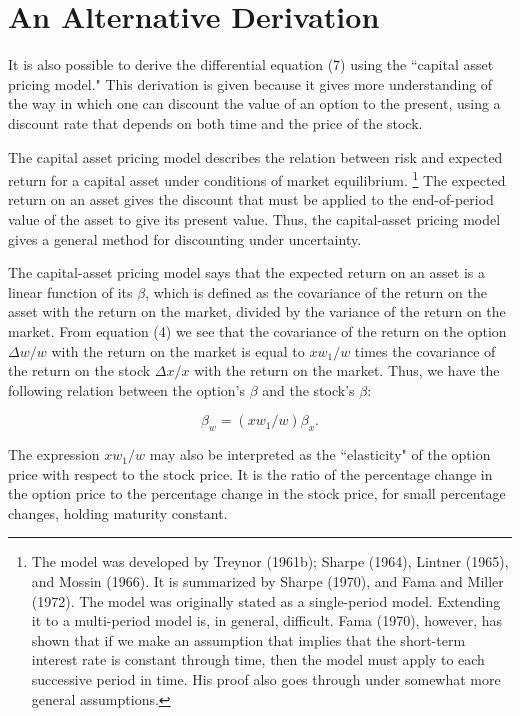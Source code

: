 \documentclass[a4paper, 12pt, twoside]{article}
\begin{document}
\section*{An Alternative Derivation}

It is also possible to derive the differential equation (7) using the ``capital asset 
pricing model." This derivation is given because it gives more understanding of the 
way in which one can discount the value of an option to the present, using a discount 
rate that depends on both time and the price of the stock.

The capital asset pricing model describes the relation between risk and expected 
return for a capital asset under conditions of market equilibrium. 
\footnote{\linespread{1}\fontsize{10}{10}\selectfont
The model was developed by Treynor (1961b); Sharpe (1964), Lintner 
(1965), and Mossin (1966). It is summarized by Sharpe (1970), and Fama and Miller 
(1972). The model was originally stated as a single-period model. Extending it to a 
multi-period model is, in general, difficult. Fama (1970), however, has shown that if 
we make an assumption that implies that the short-term interest rate is constant 
through time, then the model must apply to each successive period in time. His proof 
also goes through under somewhat more general assumptions.
}
The expected return 
on an asset gives the discount that must be applied to the end-of-period value of the 
asset to give its present value. Thus, the capital-asset pricing model gives a general 
method for discounting under uncertainty.

The capital-asset pricing model says that the expected return on an asset is a linear 
function of its $\beta$, which is defined as the covariance of the return on the asset with 
the return on the market, divided by the variance of the return on the market. From 
equation (4) we see that the covariance of the return on the option $\Delta w/w$ with the 
return on the market is equal to $xw_1/w$ times the covariance of the return on the 
stock $\Delta x/x$ with the return on the market. Thus, we have the following relation between 
the option's $\beta$ and the stock's $\beta$:

\begin{equation}
\beta_w=(xw_1/w)\beta_x.
\end{equation}

\noindent The expression $xw_1/w$ may also be interpreted as the ``elasticity" of the option price 
with respect to the stock price. It is the ratio of the percentage change in the 
option price to the percentage change in the stock price, for small percentage 
changes, holding maturity constant.
\end{document}
